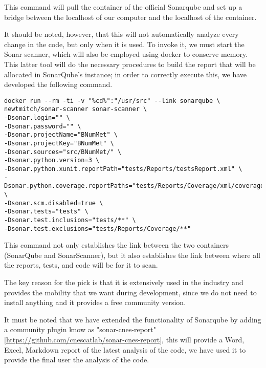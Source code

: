 This command will pull the container of the official Sonarqube and set up a bridge between the localhost of our computer and the localhost of the container.

It should be noted, however, that this will not automatically analyze every change in the code, but only when it is used. To invoke it, we must start the Sonar scanner, which will also be employed using docker to conserve memory. This latter tool will do the necessary procedures to build the report that will be allocated in SonarQube's instance; in order to correctly execute this, we have developed the following command.

\begin{lstlisting}
docker run --rm -ti -v "%cd%":"/usr/src" --link sonarqube \
newtmitch/sonar-scanner sonar-scanner \
-Dsonar.login="" \
-Dsonar.password="" \
-Dsonar.projectName="BNumMet" \
-Dsonar.projectKey="BNumMet" \
-Dsonar.sources="src/BNumMet/" \
-Dsonar.python.version=3 \
-Dsonar.python.xunit.reportPath="tests/Reports/testsReport.xml" \
-Dsonar.python.coverage.reportPaths="tests/Reports/Coverage/xml/coverage.xml" \
-Dsonar.scm.disabled=true \
-Dsonar.tests="tests" \
-Dsonar.test.inclusions="tests/**" \
-Dsonar.test.exclusions="tests/Reports/Coverage/**"
\end{lstlisting}

This command not only establishes the link between the two containers (SonarQube and SonarScanner), but it also establishes the link between where all the reports, tests, and code will be for it to scan.

The key reason for the pick is that it is extensively used in the industry and provides the mobility that we want during development, since we do not need to install anything and it provides a free community version.

It must be noted that we have extended the functionality of Sonarqube by adding a community plugin know as "sonar-cnes-report" [\href{https://github.com/cnescatlab/sonar-cnes-report}{https://github.com/cnescatlab/sonar-cnes-report}], this will provide a Word, Excel, Markdown report of the latest analysis of the code, we have used it to provide the final user the analysis of the code.
